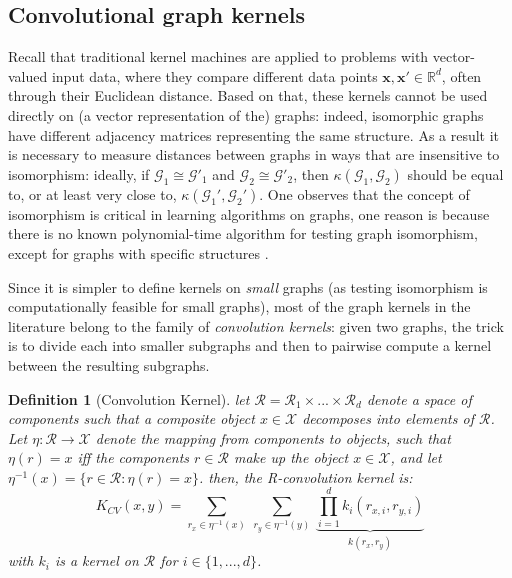 \subsection{Convolutional graph kernels}
Recall that traditional kernel machines are applied to problems with vector-valued input data, where they compare different data points $\mathbf{x},\mathbf{x}' \in \mathbb{R}^d$, often through their Euclidean distance. Based on that, these kernels cannot be used directly on (a vector representation of the) graphs: indeed, isomorphic graphs have different adjacency matrices representing the same structure. As a result it is necessary to measure distances between graphs in ways that are insensitive to isomorphism: ideally, if $\mathcal{G}_1 \cong \mathcal{G}'_1$ and $\mathcal{G}_2 \cong \mathcal{G}'_2$, then $\kappa(\mathcal{G}_1, \mathcal{G}_2)$ should be equal to, or at least very close to, $\kappa(\mathcal{G}_1', \mathcal{G}_2')$. One observes that the concept of isomorphism is critical in learning algorithms on graphs, one reason is because there is no known polynomial-time algorithm for testing graph isomorphism, except for graphs with specific structures \citep{kriege_graph_kernels}.

Since it is simpler to define kernels on \emph{small} graphs (as testing isomorphism is computationally feasible for small graphs), most of the graph kernels in the literature belong to the family of \emph{convolution kernels}: given two graphs, the trick is to divide each into smaller subgraphs and then to pairwise compute a kernel between the resulting subgraphs.
\newtheorem{definition}{Definition} 
\begin{definition}[Convolution Kernel]
	let $\mathcal{R}=\mathcal{R}_1\times...\times \mathcal{R}_d$ denote a space of components such that a composite object $x\in \mathcal{X}$ decomposes into elements of $\mathcal{R}$. Let $\eta:\mathcal{R}\xrightarrow{}\mathcal{X}$ denote the mapping from components to objects, such that $\eta(r)=x$ iff the components $r\in \mathcal{R}$ make up the object $x\in \mathcal{X}$, and let $\eta^{-1}(x)=\{r\in\mathcal{R}:\eta(r)=x\}$. then, the R-convolution kernel is:
	\begin{equation}
	\label{eq:conolutional_kernels}
	K_{CV}(x,y)=\sum_{r_x\in \eta^{-1}(x)}~\sum_{r_y\in \eta^{-1}(y)}~\underbrace{\prod_{i=1}^{d}k_i(r_{x,i},r_{y,i})}_{k(r_x,r_y)}
	\end{equation}
	with $k_i$ is a kernel on $\mathcal{R}$ for $i\in\{1,...,d\}$.
\end{definition}

